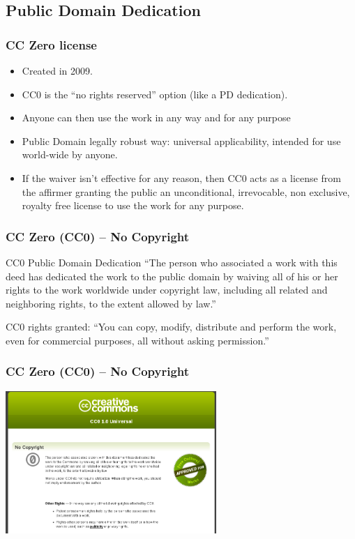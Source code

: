 \documentclass{beamer}
\begin{document}
\subsection{Public Domain Dedication}
\begin{frame}
\frametitle{CC Zero license}


\begin{itemize}
\item Created in 2009.
\item CC0 is the ``no rights reserved'' option (like a PD dedication).
\item Anyone can then use the work in any way and for any purpose
\item Public Domain legally robust way: universal applicability, intended for use world-wide by anyone.
\item If the waiver isn't effective for any reason, then CC0 acts as a license from the affirmer granting the public an unconditional, irrevocable, non exclusive, royalty free license to use the work for any purpose. 
\end{itemize}


\end{frame}


\begin{frame}
\frametitle{CC Zero (CC0) -- No Copyright}

\begin{block}{CC0 Public Domain Dedication}
``The person who associated a work with this deed has dedicated the work to the public domain by waiving all of his or her rights to the work worldwide under copyright law, including all related and neighboring rights, to the extent allowed by law.''
\end{block}

\medskip

\small
CC0 rights granted: ``\alert{You can copy, modify, distribute and perform the work, even for commercial purposes, all without asking permission.}''

\end{frame}


\begin{frame}
\frametitle{CC Zero (CC0) -- No Copyright}

\begin{center}
\includegraphics[width=8cm]{figs/cc0.png}
\end{center}


\end{frame}
\end{document}
